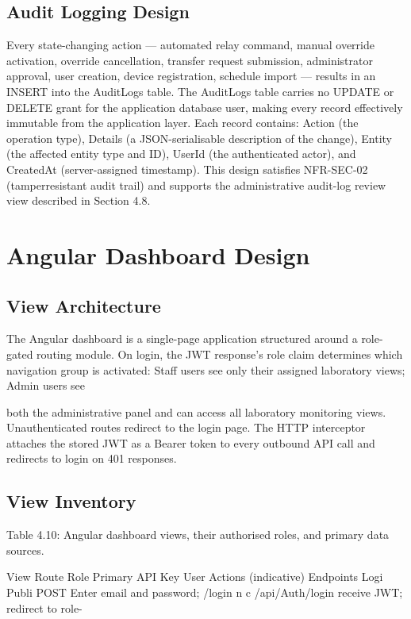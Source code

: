 \subsection{Audit Logging Design}


Every state-changing action --- automated relay command, manual override activation,
override cancellation, transfer request submission, administrator approval, user
creation, device registration, schedule import --- results in an INSERT into the AuditLogs
table. The AuditLogs table carries no UPDATE or DELETE grant for the application
database user, making every record effectively immutable from the application layer.
Each record contains: Action (the operation type), Details (a JSON-serialisable description
of the change), Entity (the affected entity type and ID), UserId (the authenticated actor),
and CreatedAt (server-assigned timestamp). This design satisfies NFR-SEC-02 (tamperresistant audit trail) and supports the administrative audit-log review view described in
Section 4.8.


\section{Angular Dashboard Design}


\subsection{View Architecture}


The Angular dashboard is a single-page application structured around a role-gated
routing module. On login, the JWT response's role claim determines which navigation
group is activated: Staff users see only their assigned laboratory views; Admin users see

both the administrative panel and can access all laboratory monitoring views.
Unauthenticated routes redirect to the login page. The HTTP interceptor attaches the
stored JWT as a Bearer token to every outbound API call and redirects to login on 401
responses.

\subsection{View Inventory}


Table 4.10: Angular dashboard views, their authorised roles, and primary data sources.


View Route Role Primary API Key User Actions
(indicative) Endpoints
Logi Publi POST Enter email and password;
/login
n c /api/Auth/login receive JWT; redirect to role-




